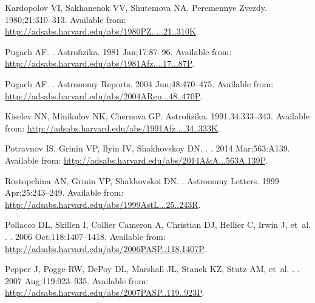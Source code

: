 \documentclass[]{rsos}
\begin{document}
\begin{thebibliography}{10}
{Kardopolov} VI, {Sakhanenok} VV, {Shutemova} NA.
\newblock Peremennye Zvezdy. 1980;21:310--313.
\newblock Available from:
  \url{http://adsabs.harvard.edu/abs/1980PZ.....21..310K}.

{Pugach} AF.
.
\newblock Astrofizika. 1981 Jan;17:87--96.
\newblock Available from:
  \url{http://adsabs.harvard.edu/abs/1981Afz....17...87P}.

{Pugach} AF.
.
\newblock Astronomy Reports. 2004 Jun;48:470--475.
\newblock Available from:
  \url{http://adsabs.harvard.edu/abs/2004ARep...48..470P}.

{Kiselev} NN, {Minikulov} NK, {Chernova} GP.
\newblock Astrofizika. 1991;34:333--343.
\newblock Available from:
  \url{http://adsabs.harvard.edu/abs/1991Afz....34..333K}.

{Potravnov} IS, {Grinin} VP, {Ilyin} IV, {Shakhovskoy} DN.
.
\newblock \aap. 2014 Mar;563:A139.
\newblock Available from:
  \url{http://adsabs.harvard.edu/abs/2014A&A...563A.139P}.

{Rostopchina} AN, {Grinin} VP, {Shakhovskoi} DN.
.
\newblock Astronomy Letters. 1999 Apr;25:243--249.
\newblock Available from:
  \url{http://adsabs.harvard.edu/abs/1999AstL...25..243R}.

{Pollacco} DL, {Skillen} I, {Collier Cameron} A, {Christian} DJ, {Hellier} C,
  {Irwin} J, et~al.
.
\newblock \pasp. 2006 Oct;118:1407--1418.
\newblock Available from:
  \url{http://adsabs.harvard.edu/abs/2006PASP..118.1407P}.

{Pepper} J, {Pogge} RW, {DePoy} DL, {Marshall} JL, {Stanek} KZ, {Stutz} AM,
  et~al.
.
\newblock \pasp. 2007 Aug;119:923--935.
\newblock Available from:
  \url{http://adsabs.harvard.edu/abs/2007PASP..119..923P}.


\end{thebibliography}
\end{document}
